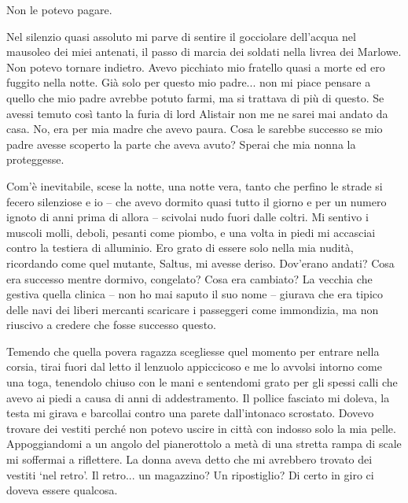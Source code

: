 Non le potevo pagare.

Nel silenzio quasi assoluto mi parve di sentire il gocciolare dell'acqua
nel mausoleo dei miei antenati, il passo di marcia dei soldati nella
livrea dei Marlowe. Non potevo tornare indietro. Avevo picchiato mio
fratello quasi a morte ed ero fuggito nella notte. Già solo per questo
mio padre... non mi piace pensare a quello che mio padre avrebbe potuto
farmi, ma si trattava di più di questo. Se avessi temuto così tanto la
furia di lord Alistair non me ne sarei mai andato da casa. No, era per
mia madre che avevo paura. Cosa le sarebbe successo se mio padre avesse
scoperto la parte che aveva avuto? Sperai che mia nonna la proteggesse.

\begin{figure}
	\centering
	\def\svgwidth{\columnwidth}
	\scalebox{0.2}{}
\end{figure}

Com'è inevitabile, scese la notte, una notte vera, tanto che perfino le
strade si fecero silenziose e io -- che avevo dormito quasi tutto il
giorno e per un numero ignoto di anni prima di allora -- scivolai nudo
fuori dalle coltri. Mi sentivo i muscoli molli, deboli, pesanti come
piombo, e una volta in piedi mi accasciai contro la testiera di
alluminio. Ero grato di essere solo nella mia nudità, ricordando come
quel mutante, Saltus, mi avesse deriso. Dov'erano andati? Cosa era
successo mentre dormivo, congelato? Cosa era cambiato? La vecchia che
gestiva quella clinica -- non ho mai saputo il suo nome -- giurava che
era tipico delle navi dei liberi mercanti scaricare i passeggeri come
immondizia, ma non riuscivo a credere che fosse successo questo.

Temendo che quella povera ragazza scegliesse quel momento per entrare
nella corsia, tirai fuori dal letto il lenzuolo appiccicoso e me lo
avvolsi intorno come una toga, tenendolo chiuso con le mani e sentendomi
grato per gli spessi calli che avevo ai piedi a causa di anni di
addestramento. Il pollice fasciato mi doleva, la testa mi girava e
barcollai contro una parete dall'intonaco scrostato. Dovevo trovare dei
vestiti perché non potevo uscire in città con indosso solo la mia pelle.
Appoggiandomi a un angolo del pianerottolo a metà di una stretta rampa
di scale mi soffermai a riflettere. La donna aveva detto che mi
avrebbero trovato dei vestiti `nel retro'. Il retro... un magazzino? Un
ripostiglio? Di certo in giro ci doveva essere qualcosa.

